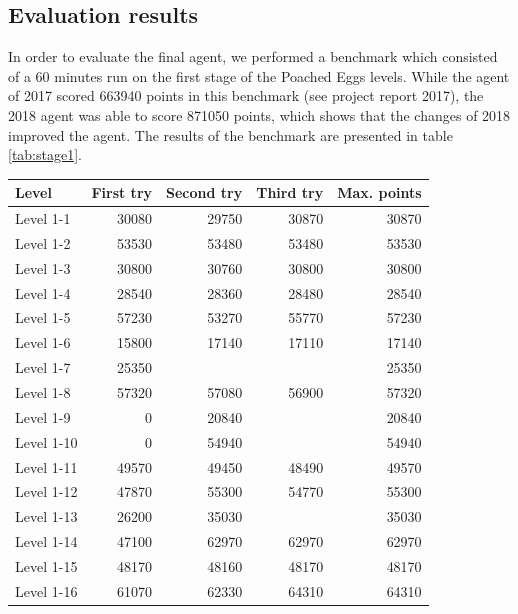 \subsection{Evaluation results}
In order to evaluate the final agent, we performed a benchmark which consisted of a 60 minutes run on the first stage of the Poached Eggs levels. While the agent of 2017 scored 663940 points in this benchmark (see project report 2017), the 2018 agent was able to score 871050 points, which shows that the changes of 2018 improved the agent. The results of the benchmark are presented in table \ref{tab:stage1}.
\begin{table}[h]
	\begin{center}
		\begin{tabular}{l | r r r r}
			Level       & First try & Second try & Third try & Max. points \\
			\hline
			\hline
			Level 1-1   &  30080 &  29750  & 30870   &   30870 \\
			\hline
			Level  1-2  &  53530 &  53480  &  53480  &   53530 \\
			\hline
			Level  1-3  &  30800 &  30760  & 30800   &   30800 \\
			\hline
			Level  1-4  &  28540 &  28360  & 28480   &   28540 \\
			\hline
			Level  1-5  &  57230 &  53270  &  55770  &   57230  \\
			\hline
			Level  1-6  &  15800 &  17140  &   17110 &   17140 \\
			\hline
			Level  1-7  &  25350 &         &         &   25350 \\
			\hline
			Level  1-8  &  57320 &  57080  &  56900  &   57320 \\
			\hline
			Level  1-9  &  0     &  20840  &         &   20840 \\
			\hline
			Level  1-10 &  0     &  54940  &         &   54940      \\
			\hline
			Level  1-11 &  49570 &  49450  & 48490   &   49570      \\
			\hline
			Level  1-12 &  47870 &  55300  &  54770  &   55300 \\
			\hline
			Level  1-13 &  26200 &  35030  &         &   35030      \\
			\hline
			Level  1-14 &  47100 &  62970  &  62970  &   62970 \\
			\hline
			Level  1-15 &  48170 &  48160  &   48170 &   48170      \\
			\hline
			Level  1-16 &  61070 &  62330  &  64310  &   64310 \\

\end{tabular}
\end{center}
\end{table}
